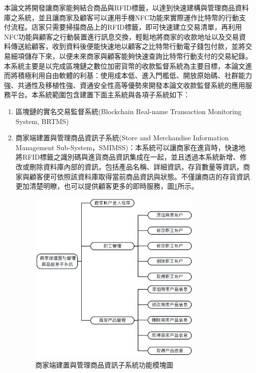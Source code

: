 	本論文將開發讓商家能夠結合商品與RFID標籤，以達到快速建構與管理商品資料庫之系統，並且讓商家及顧客可以運用手機NFC功能來實際運作比特幣的行動支付流程。店家只需要掃描商品上的RFID標籤，即可快速建立交易清單，再利用NFC功能與顧客之行動裝置進行訊息交換，輕鬆地將商家的收款地址以及交易資料傳送給顧客，收到資料後便能快速地以顧客之比特幣行動電子錢包付款，並將交易細項儲存下來，以便未來商家與顧客能夠快速查詢比特幣行動支付的交易紀錄。
	本系統主要是以完成區塊鏈之數位加密貨幣的收款監督系統為主要目標，本論文進而將積極利用自由軟體的利基：使用成本低、進入門檻低、開放原始碼、社群能力強、共通性及移植性強、資通安全性高等優勢來開發本論文收款監督系統的應用服務平台。本系統範圍包含建置下面主系統與各項子系統如下：
		\begin{enumerate}
		\item 區塊鏈的實名交易監督系統(Blockchain Real-name Transaction Monitoring System, BRTMS)
		\item 商家端建置與管理商品資訊子系統(Store and Merchandise Information Management Sub-System，SMIMSS)：本系統可以讓商家在進貨時，快速地將RFID標籤之識別碼與進貨商品資訊集成在一起，並且透過本系統新增、修改或刪除資料庫內部的資訊，包括產品名稱、詳細資訊，存貨數量等資訊，商家與顧客便可依照該資料庫取得當前商品資訊與狀態。不僅讓商店的存貨資訊更加清楚明瞭，也可以提供顧客更多的即時服務，圖\ref{model1}所示。

			\begin{figure}[htbp]
			\centering
			\includegraphics[width = 0.8\textwidth]{model1.jpg}
			\caption{商家端建置與管理商品資訊子系統功能模塊圖}\label{model1}
			\end{figure}




\end{enumerate}
